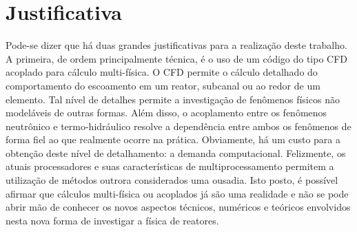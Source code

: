 %

\section{Justificativa}

Pode-se dizer que há duas grandes justificativas para a realização deste trabalho. A primeira, de ordem principalmente
técnica, é o uso de um código do tipo CFD acoplado para cálculo multi-física. O CFD permite o cálculo detalhado do
comportamento do escoamento em um reator, subcanal ou ao redor de um elemento. Tal nível de detalhes permite a
investigação de fenômenos físicos não modeláveis de outras formas. Além disso,
o acoplamento entre os fenômenos neutrônico e termo-hidráulico resolve a dependência entre ambos os fenômenos de forma
fiel ao que realmente ocorre na prática. Obviamente, há um custo para a obtenção deste nível de detalhamento: a
demanda computacional. Felizmente, os atuais processadores e suas características de multiprocessamento permitem
a utilização de métodos outrora considerados uma ousadia. Isto posto, é possível afirmar que cálculos multi-física ou
acoplados já são uma realidade e não se pode abrir mão de conhecer os novos aspectos técnicos, numéricos e teóricos
envolvidos nesta nova forma de investigar a física de reatores.

